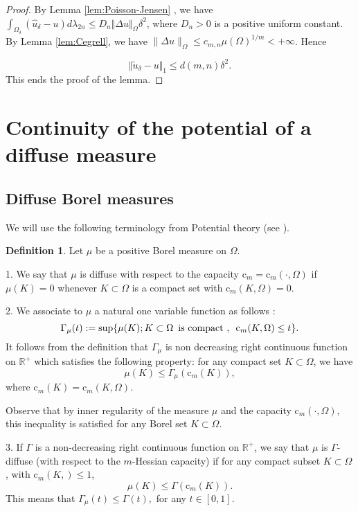 \documentclass[12pt]{amsart}
\theoremstyle{definition}
\newtheorem{definition}[theorem]{Definition}
\numberwithin{theorem}{section}
\numberwithin{equation}{section}
\newcommand{\R}{\mathbb{R}}
\begin{document}
{\begin{proof}
 
 By Lemma \ref{lem:Poisson-Jensen} , we have $\int_{\Omega_\delta} (\widehat{u}_\delta - u ) d \lambda_{2 n} \leq D_n \Vert \Delta u\Vert_{\Omega} \delta^2$, where $D_n > 0$ is a positive uniform constant. 
 By Lemma \ref{lem:Cegrell},  we have $\|\Delta u\|_{\Omega} \leq c_{m,n}  \mu (\Omega)^{1 \slash m} < + \infty$.
 Hence
 
 $$
\Vert \tilde{u}_{\delta} - u \Vert_1  \leq d (m,n) \delta^2.
 $$
 This ends the proof of the lemma.
 \end{proof}


\section{Continuity of the potential of a diffuse measure}


\subsection{Diffuse Borel measures}


We will use the following terminology from Potential theory (see \cite{Po16}). 
\begin{definition}  \label{def:cap-domination} Let $\mu$ be  a positive Borel measure on $\Omega$. 
 
 1. We say that $\mu$ is diffuse  with respect to  the capacity $  \text{c}_m = \text{c}_m (\cdot,\Omega)$ if  $\mu (K) = 0$ whenever $K \subset \Omega$ is a compact set with $ \text{c}_m (K,\Omega) = 0$. 
 
2. We associate to $\mu$ a natural one variable function as follows :
\begin{equation} \label{eq:AC}
 \Gamma _\mu (t) := \sup \{ \mu (K) ; K \subset \Omega \, \, \, \hbox{is compact },  \, \, \,   \text{c}_m (K,\Omega) \leq t\}.
\end{equation}
It follows from the definition that $\Gamma_\mu$ is non decreasing right continuous function on $\R^+$ which satisfies the following property: for any compact set $K \subset \Omega$, we have
\begin{equation} \label{eq:capdomination}
\mu (K) \leq \Gamma _\mu \left(\text{c}_m (K)\right),
\end{equation}
where $\text{c}_m (K) = \text{c}_m (K,\Omega)$. 

 Observe that by inner regularity of the measure $\mu$ and the capacity $ \text{c}_m (\cdot,\Omega)$, this inequality is satisfied for any Borel set $K \subset \Omega$.
 
3. If $\Gamma$ is a non-decreasing right continuous function on $\R^+$, we say that $\mu$ is $\Gamma$-diffuse (with respect to  the $m$-Hessian capacity)  if for any compact subset $K \subset \Omega$, with $\text{c}_m (K,) \leq 1$, 
\begin{equation} \label{eq:capdomination}
 \mu (K) \leq  \Gamma \left( \text{c}_m (K)\right). 
\end{equation}
This means that $\Gamma_\mu (t) \leq \Gamma (t),$ for any $t \in [0,1]$.
\end{definition}
 
}
\end{document}
